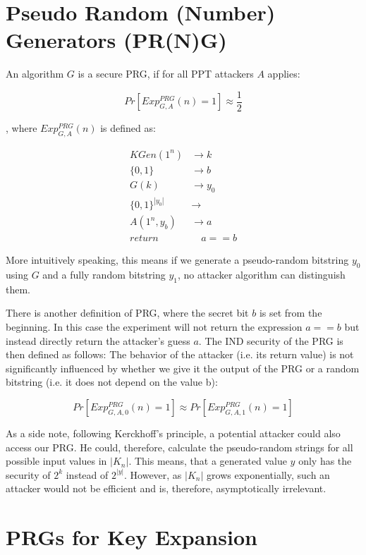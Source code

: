 \section{Pseudo Random (Number) Generators (PR(N)G)}

An algorithm $G$ is a secure PRG, if for all PPT attackers $A$ applies:

$$
    Pr[Exp_{G,A}^{PRG}(n) = 1] \approx \frac{1}{2}
$$

, where $Exp_{G,A}^{PRG}(n)$ is defined as:

\begin{align}
    KGen(1^n)        & \rightarrow k   \\
    \{0, 1\}         & \rightarrow b   \\
    G(k)             & \rightarrow y_0 \\
    \{0, 1\}^{|y_0|} & \rightarrow     \\
    A(1^n, y_b)      & \rightarrow a   \\
    return           & \quad a == b
\end{align}

More intuitively speaking, this means if we generate a pseudo-random bitstring $y_0$ using $G$ and a fully random bitstring $y_1$, no attacker algorithm can distinguish them.

There is another definition of PRG, where the secret bit $b$ is set from the beginning. In this case the experiment will not return the expression $a==b$ but instead directly return the attacker's guess $a$. The IND security of the PRG is then defined as follows: The behavior of the attacker (i.e. its return value) is not significantly influenced by whether we give it the output of the PRG or a random bitstring (i.e. it does not depend on the value b):

$$
    Pr[Exp_{G,A,0}^{PRG}(n) = 1] \approx Pr[Exp_{G,A,1}^{PRG}(n) = 1]
$$

As a side note, following Kerckhoff's principle, a potential attacker could also access our PRG. He could, therefore, calculate the pseudo-random strings for all possible input values in $|K_n|$. This means, that a generated value $y$ only has the security of $2^k$ instead of $2^{|y|}$. However, as $|K_n|$ grows exponentially, such an attacker would not be efficient and is, therefore, asymptotically irrelevant.

\section{PRGs for Key Expansion}

